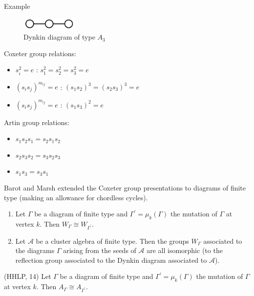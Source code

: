 \documentclass{beamer}
\begin{document}
\begin{frame}{Example}
\begin{figure}
\centering
\includegraphics[scale = .65]{DynkinA3.PNG}
\caption{Dynkin diagram of type $A_3$}
\end{figure}

Coxeter group relations:
\begin{itemize}
\item $s_i^2 = e$ :  $s_1^2 = s_2^2 = s_3^2 = e$ 
\item $(s_is_j)^{m_{ij}} = e$ :  $(s_1s_2)^3 = (s_2s_3)^3 = e$
\item  $(s_is_j)^{m_{ij}} = e$ :  $(s_1s_3)^2 = e$
\end{itemize}

Artin group relations:
\begin{itemize}
\item $s_1s_2s_1 = s_2s_1s_2$
\item $s_2s_3s_2 = s_3s_2s_3$
\item $s_1s_3 = s_3s_1$
\end{itemize}

\end{frame}


\begin{frame}
Barot and Marsh extended the Coxeter group presentations to diagrams of finite type (making an allowance for chordless cycles).
\begin{theorem}
\begin{enumerate}
\item Let $\Gamma$ be a diagram of finite type and $\Gamma^{\prime} = \mu_k(\Gamma)$ the mutation of $\Gamma$ at vertex $k$. Then $W_{\Gamma} \cong W_{\Gamma^{\prime}}$.
\item Let $\mathscr{A}$ be a cluster algebra of finite type. Then the groups $W_{\Gamma}$ associated to the diagrams $\Gamma$ arising from the seeds of $\mathscr{A}$ are all isomorphic (to the reflection group associated to the Dynkin diagram associated to $\mathscr{A}$).
\end{enumerate}
\end{theorem}


\pause
\begin{theorem}{(HHLP, 14)}
 Let $\Gamma$ be a diagram of finite type and $\Gamma^{\prime} = \mu_k(\Gamma)$ the mutation of $\Gamma$ at vertex $k$. Then $A_{\Gamma} \cong A_{\Gamma^{\prime}}$. 
\end{theorem}
\end{frame}
\end{document}
